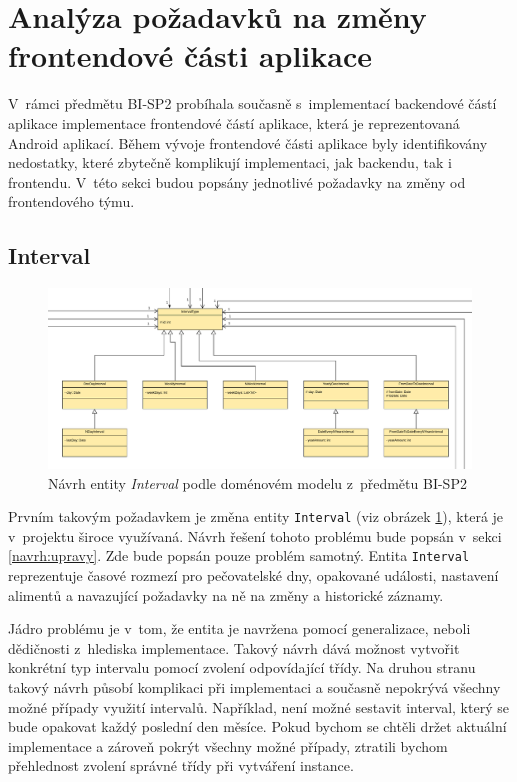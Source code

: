 \section{Analýza požadavků na změny frontendové části aplikace}\label{analyza:pozadavky-frontendu}
    V~rámci předmětu BI-SP2 probíhala současně s~implementací backendové částí aplikace implementace frontendové částí aplikace, která je reprezentovaná Android aplikací. Během vývoje frontendové části aplikace byly identifikovány nedostatky, které zbytečně komplikují implementaci, jak backendu, tak i frontendu. V~této sekci budou popsány jednotlivé požadavky na změny od frontendového týmu.
    
    \subsection{Interval}\label{analyza:pozadavky:interval}
        \begin{figure}\centering
	        \includegraphics[width=1.0\textwidth]{pdfs/Interval1}
	        \caption[Současný návrh entity \texttt{Interval}]{Návrh entity \textit{Interval} podle doménovém modelu z~předmětu BI-SP2}\label{image:Interval1}
        \end{figure}
        Prvním takovým požadavkem je změna entity \verb|Interval| (viz obrázek \ref{image:Interval1}), která je v~projektu široce využívaná. Návrh řešení tohoto problému bude popsán v~sekci \ref{navrh:upravy}. Zde bude popsán pouze problém samotný. Entita \verb|Interval| reprezentuje časové rozmezí pro pečovatelské dny, opakované události, nastavení alimentů a navazující požadavky na ně na změny a historické záznamy.
            
        Jádro problému je v~tom, že entita je navržena pomocí generalizace, neboli dědičnosti z~hlediska implementace. Takový návrh dává možnost vytvořit konkrétní typ intervalu pomocí zvolení odpovídající třídy. Na druhou stranu takový návrh působí komplikaci při implementaci a současně nepokrývá všechny možné případy využití intervalů. Například, není možné sestavit interval, který se bude opakovat každý poslední den měsíce. Pokud bychom se chtěli držet aktuální implementace a zároveň pokrýt všechny možné případy, ztratili bychom přehlednost zvolení správné třídy při vytváření instance.
            
